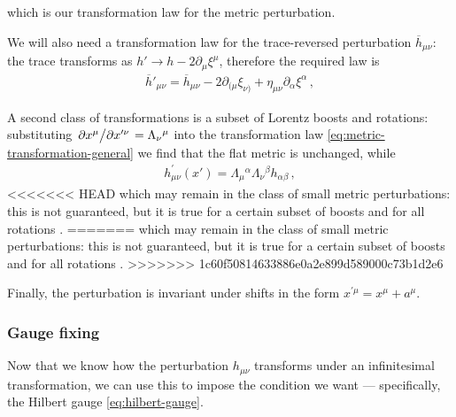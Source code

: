 \documentclass[main.tex]{subfiles}
\begin{document}
%
%
which is our transformation law for the metric perturbation. 

We will also need a transformation law for the trace-reversed perturbation \(\overline{h}_{\mu \nu }\): the trace transforms as \(h' \to h - 2 \partial_{\mu } \xi^{\mu }\), therefore the required law is 
%
\begin{align} \label{eq:perturbation-transformation-infinitesimal-tracereversed}
\overline{h}'_{\mu \nu } = \overline{h}_{\mu \nu } - 2 \partial_{(\mu } \xi_{\nu )} + \eta_{\mu \nu } \partial_{\alpha } \xi^{\alpha }
\,,
\end{align}
%


A second class of transformations is a subset of Lorentz boosts and rotations: substituting \(\pdv*{x^{\mu }}{x^{\prime \nu }} = \Lambda_\nu{}^{\mu }\) into the transformation law \eqref{eq:metric-transformation-general} we find that the flat metric is unchanged, while 
%
\begin{align}
h^{\prime }_{\mu \nu } ( x') = \Lambda_{\mu }{}^{\alpha }
\Lambda_{\nu }{}^{\beta } h_{\alpha \beta }
\,,
\end{align}
%
<<<<<<< HEAD
which may remain in the class of small metric perturbations: this is not guaranteed, but it is true for a certain subset of boosts and for all rotations \cite{maggioreGravitationalWavesVolume2007}. 
=======
which may remain in the class of small metric perturbations: this is not guaranteed, but it is true for a certain subset of boosts and for all rotations \cite[]{maggioreGravitationalWavesVolume2007}. 
>>>>>>> 1c60f50814633886e0a2e899d589000c73b1d2e6

Finally, the perturbation is invariant under shifts in the form \(x^{\prime \mu }= x^{\mu } + a^{\mu }\). 

\subsubsection{Gauge fixing} \label{sec:gauge-fixing}

Now that we know how the perturbation \(h_{\mu \nu }\) transforms under an infinitesimal transformation, we can use this to impose the condition we want --- specifically, the Hilbert gauge \eqref{eq:hilbert-gauge}.
\end{document}
